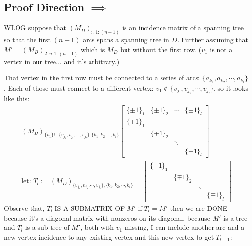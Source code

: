 \documentclass[]{article}
\theoremstyle{definition}
\begin{document}
    \subsection{Proof Direction $\implies$}
        WLOG suppose that $(M_D)_{:, 1:(n - 1)}$ is an incidence matrix of a spanning tree so that the first $(n - 1)$ arcs spans a spanning tree in $D$. Further assuming that $M' = (M_D)_{2:n, 1:(n - 1)}$ which is $M_D$ but without the first row. ($v_1$ is not a vertex in our tree... and it's arbitrary.)
        \par
        That vertex in the first row must be connected to a series of arcs: $\{a_{k_1}, a_{k_2}, \cdots, a_{k_l}\}$. Each of those must connect to a different vertex: $v_1\not\in\{v_{j_1}, v_{j_2}, \cdots, v_{j_l}\}$, so it looks like this: 
        \begin{align}
            (M_D)_{\{v_1\}\cup\{v_{j_1}, v_{j_2}, \cdots, v_{j_l}\}, \{k_1, k_2, \cdots, k_l\}}
            \begin{bmatrix}
                \{\pm 1\}_1 &\{\pm 1\}_2  & \cdots& \{\pm 1\}_l
                \\
                \{\mp 1\}_1 &             &       & 
                \\
                &\{\mp 1\}_2     &       & 
                \\
                & &\ddots &
                \\
                & & & \{\mp 1\}_l
            \end{bmatrix}
            \\
            \text{let: }T_l := (M_D)_{\{v_{j_1}, v_{j_2}, \cdots, v_{j_l}\}, \{k_1, k_2, \cdots, k_l\}} 
            = \begin{bmatrix}
                \{\mp 1\}_1 &             &       & 
                \\
                &\{\mp 1\}_2     &       & 
                \\
                & &\ddots &
                \\
                & & & \{\mp 1\}_l
            \end{bmatrix}
        \end{align}
        Observe that, $T_l$ IS A SUBMATRIX OF $M'$ if $T_l = M'$ then we are DONE because it's a diagonal matrix with nonzeros on its diagonal, because $M'$ is a tree and $T_l$ is a sub tree of $M'$, both with $v_1$ missing, I can include another arc and a new vertex incidence to any existing vertex and this new vertex to get $T_{l + 1}$: 
\end{document}
